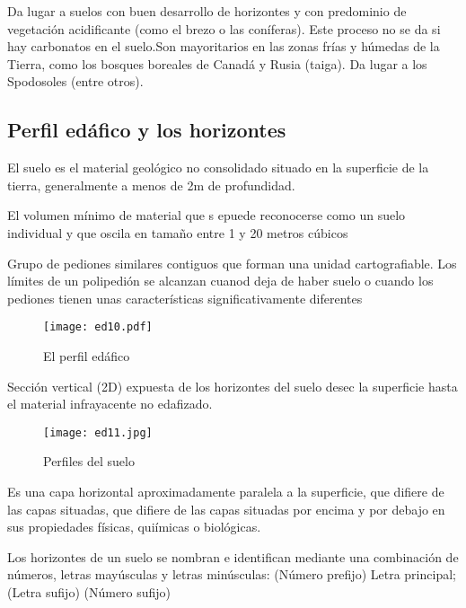 \begin{definition}[Podzolización]
    Da lugar a suelos con buen desarrollo de horizontes y con predominio de vegetación acidificante (como el brezo o las coníferas). Este proceso no se da si hay carbonatos en el suelo.Son mayoritarios en las zonas frías y húmedas de la Tierra, como los bosques boreales de Canadá y Rusia (taiga).
Da lugar a los Spodosoles (entre otros).
\end{definition}
\subsection{Perfil edáfico y los horizontes}

El suelo es el material geológico no consolidado situado en la superficie de la tierra, generalmente a menos de 2m de profundidad.

\begin{definition}[Pedión]
    El volumen mínimo de material que s epuede reconocerse como un suelo individual y que oscila en tamaño entre 1 y 20 metros cúbicos
\end{definition}

\begin{definition}[Poliédión]
    Grupo de pediones similares contiguos que forman una unidad cartografiable. Los límites de un polipedión se alcanzan cuanod deja de haber suelo o cuando los pediones tienen unas características significativamente diferentes
\end{definition}

\begin{figure}[h!]
\centering
  \texttt{[image: ed10.pdf]}
  \caption{El perfil edáfico}
  \label{ed10}
\end{figure}

\begin{definition}
    Sección vertical (2D) expuesta de los horizontes del suelo desec la superficie hasta el material infrayacente no edafizado.
\end{definition}
\begin{figure}[h!]
\centering
  \texttt{[image: ed11.jpg]}
  \caption{Perfiles del suelo}
  \label{ed11}
\end{figure}

\begin{definition}
    Es una capa horizontal aproximadamente paralela a la superficie, que difiere de las capas situadas, que difiere de las capas situadas por encima y por debajo en sus propiedades físicas, quiímicas o biológicas.
\end{definition}
Los horizontes de un suelo se nombran e identifican mediante una combinación de números, letras mayúsculas y letras minúsculas: (Número prefijo) Letra principal; (Letra sufijo) (Número sufijo)

